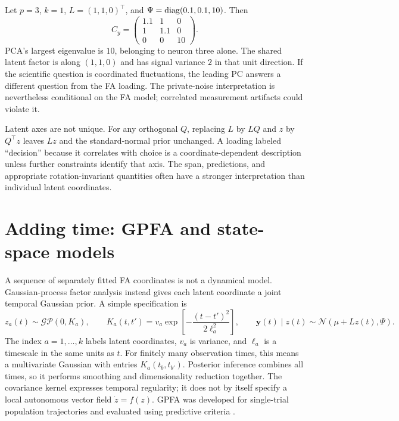 \begin{example}
Let $p=3$, $k=1$, $L=(1,1,0)^\top$, and $\Psi=\operatorname{diag}(0.1,0.1,10)$. Then
\[
 C_y=\begin{pmatrix}1.1&1&0\\1&1.1&0\\0&0&10\end{pmatrix}.
\]
PCA's largest eigenvalue is $10$, belonging to neuron three alone. The shared latent factor is along $(1,1,0)$ and has signal variance $2$ in that unit direction. If the scientific question is coordinated fluctuations, the leading PC answers a different question from the FA loading. The private-noise interpretation is nevertheless conditional on the FA model; correlated measurement artifacts could violate it.
\end{example}

Latent axes are not unique. For any orthogonal $Q$, replacing $L$ by $LQ$ and $z$ by $Q^\top z$ leaves $Lz$ and the standard-normal prior unchanged. A loading labeled ``decision'' because it correlates with choice is a coordinate-dependent description unless further constraints identify that axis. The span, predictions, and appropriate rotation-invariant quantities often have a stronger interpretation than individual latent coordinates.

\section{Adding time: GPFA and state-space models}
A sequence of separately fitted FA coordinates is not a dynamical model. Gaussian-process factor analysis instead gives each latent coordinate a joint temporal Gaussian prior. A simple specification is
\begin{equation}
 z_a(t)\sim\mathcal{GP}(0,K_a),\qquad
 K_a(t,t')=v_a\exp\!\left[-\frac{(t-t')^2}{2\ell_a^2}\right],
 \qquad \mathbf y(t)\mid z(t)\sim\mathcal N(\mu+Lz(t),\Psi).
 \label{eq:06-gpfa}
\end{equation}
The index $a=1,\ldots,k$ labels latent coordinates, $v_a$ is variance, and $\ell_a$ is a timescale in the same units as $t$. For finitely many observation times, this means a multivariate Gaussian with entries $K_a(t_b,t_{b'})$. Posterior inference combines all times, so it performs smoothing and dimensionality reduction together. The covariance kernel expresses temporal regularity; it does not by itself specify a local autonomous vector field $\dot z=f(z)$. GPFA was developed for single-trial population trajectories and evaluated using predictive criteria \citep{app_yu2009}.

